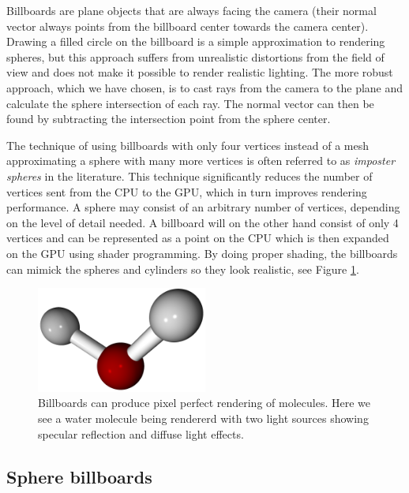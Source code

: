 \documentclass[aps,pre,twocolumn,letterpaper,floatfix,nofootinbib]{revtex4}
\begin{document}
Billboards are plane objects that are always facing the camera (their normal
vector always points from the billboard center towards the camera center).
Drawing a filled circle on the billboard is a simple approximation to rendering
spheres, but this approach suffers from unrealistic distortions from the field
of view and does not make it possible to render realistic lighting.
The more robust approach, which we have chosen,
is to cast rays from the camera to the plane and calculate the sphere
intersection of each ray.
The normal vector can then be found by subtracting the intersection point from
the sphere center.

The technique of using billboards with only four vertices instead of a mesh
approximating a sphere with many more vertices is often referred to as
\emph{imposter spheres} in the literature.
This technique significantly reduces the number of vertices sent from the CPU to
the GPU, which in turn improves rendering performance.
A sphere may consist of an arbitrary number of vertices,
depending on the level of detail needed.
A billboard will on the other hand consist of only 4 vertices and can be
represented as a point on the CPU which is then expanded on the GPU using shader
programming.
By doing proper shading, the billboards can mimick the spheres and cylinders so
they look realistic, see Figure \ref{fig:final_billboards}.

\begin{figure}
	\centering
	\includegraphics[width=0.5\textwidth]{final_billboard.png}
	\caption{Billboards can produce pixel perfect rendering of molecules. Here we see a water molecule being rendererd with two light sources showing specular reflection and diffuse light effects.}
	\label{fig:final_billboards}
\end{figure}

\subsection{Sphere billboards}
\end{document}
